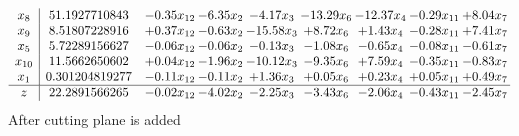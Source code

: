 \documentclass[8pt]{article}
\begin{document}
\[\begin{array}{c| c c@{\hskip 2pt} c@{\hskip 2pt} c@{\hskip 2pt} c@{\hskip 2pt} c@{\hskip 2pt} c@{\hskip 2pt} c@{\hskip 2pt} }
 x_{8}   &  51.1927710843 & -0.35 x_{12} & -6.35 x_{2} & -4.17 x_{3} & -13.29 x_{6} & -12.37 x_{4} & -0.29 x_{11} & +  8.04 x_{7}\\
 x_{9}   &  8.51807228916 & +  0.37 x_{12} & -0.63 x_{2} & -15.58 x_{3} & +  8.72 x_{6} & +  1.43 x_{4} & -0.28 x_{11} & +  7.41 x_{7}\\
 x_{5}   &  5.72289156627 & -0.06 x_{12} & -0.06 x_{2} & -0.13 x_{3} & -1.08 x_{6} & -0.65 x_{4} & -0.08 x_{11} & -0.61 x_{7}\\
 x_{10}   &  11.5662650602 & +  0.04 x_{12} & -1.96 x_{2} & -10.12 x_{3} & -9.35 x_{6} & +  7.59 x_{4} & -0.35 x_{11} & -0.83 x_{7}\\
 x_{1}   &  0.301204819277 & -0.11 x_{12} & -0.11 x_{2} & +  1.36 x_{3} & +  0.05 x_{6} & +  0.23 x_{4} & +  0.05 x_{11} & +  0.49 x_{7}\\
\hline
z    &  22.2891566265 & -0.02 x_{12} & -4.02 x_{2} & -2.25 x_{3} & -3.43 x_{6} & -2.06 x_{4} & -0.43 x_{11} & -2.45 x_{7}\\
\end{array}\]
 After cutting plane is added 
\end{document}
